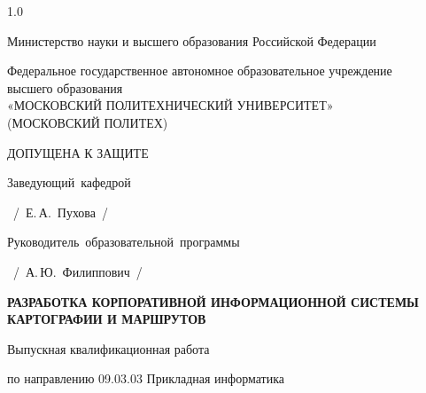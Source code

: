 \begin{titlepage}
\begin{spacing}{1.0}

\begin{center}
Министерство науки и высшего образования Российской Федерации

\vspace{12pt}

Федеральное государственное автономное образовательное учреждение\\
высшего образования\\
«МОСКОВСКИЙ ПОЛИТЕХНИЧЕСКИЙ УНИВЕРСИТЕТ»\\
(МОСКОВСКИЙ ПОЛИТЕХ)
\end{center}

\vspace{24pt}

\begin{flushright}
\begin{minipage}{0.58\textwidth}
\raggedright
ДОПУЩЕНА К ЗАЩИТЕ

\vspace{10pt}

\mbox{Заведующий кафедрой}\\

\vspace{10pt}

\mbox{\makebox[4.2cm][l]{\hrulefill} / Е.\,А.~Пухова /}

\vspace{14pt}

\mbox{Руководитель образовательной программы}\\

\vspace{10pt}

\mbox{\makebox[4.2cm][l]{\hrulefill} / А.\,Ю.~Филиппович /}
\end{minipage}
\end{flushright}

\vspace{\fill}

\begin{center}
\textbf{РАЗРАБОТКА КОРПОРАТИВНОЙ ИНФОРМАЦИОННОЙ СИСТЕМЫ КАРТОГРАФИИ И МАРШРУТОВ}

\vspace{12pt}

Выпускная квалификационная работа

\vspace{6pt}

по направлению 09.03.03 Прикладная информатика


\end{center}
\end{spacing}
\end{titlepage}
